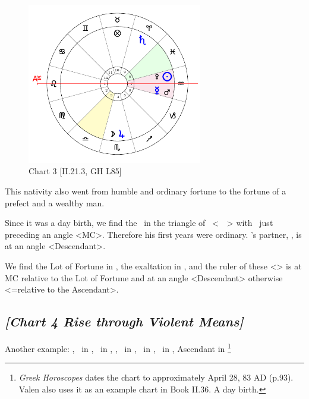 \clearpage
\begin{figure}
\centering
\includegraphics[width=0.68\textwidth]{charts/2_21_3}
\caption{Chart 3 [II.21.3, GH L85]}
\label{fig:chart03}
\end{figure}

This nativity also went from humble and ordinary fortune to the fortune of a prefect and a wealthy man. 

Since it was a day birth, we find the \Sun\, in the triangle of \Saturn\, <\Aquarius\, \Gemini\, \Libra> with \Saturn\, just preceding an angle <MC>. Therefore his first years were ordinary. \Saturn’s partner, \Mercury, is at an angle <Descendant>. 

We find the Lot of Fortune in \Taurus, the exaltation in \Libra, and the ruler of these <\Venus> is at MC relative to the Lot of Fortune and at an angle <Descendant> otherwise <=relative to the Ascendant>.
\newpage
\subsection*{\textit{[Chart 4 Rise through Violent Means]}}

Another example: \Sun, \Mercury\, in \Taurus, \Moon\, in \Aquarius, \Saturn, \Venus\, in \Aries, \Jupiter\, in \Virgo, \Mars\, in \Pisces, Ascendant in \Leo
\footnote{\textit{Greek Horoscopes} dates the chart to approximately April 28, 83 AD (p.93). Valen also uses it as an example chart in Book II.36. A day birth.}

